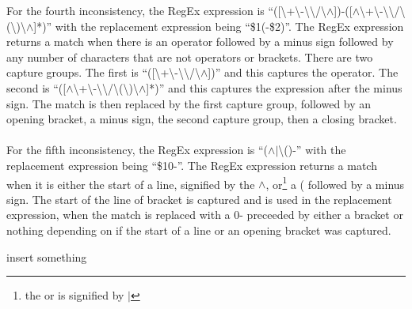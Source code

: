 \documentclass{article}
\begin{document}
For the fourth inconsistency, the RegEx expression is
``([\textbackslash+\textbackslash-\textbackslash*\textbackslash/\textbackslash$\wedge$])-([$\wedge$\textbackslash+\textbackslash-\textbackslash*\textbackslash/\textbackslash(\textbackslash)\textbackslash$\wedge$]*)''
with the replacement expression being ``\$1(-\$2)''. The RegEx expression returns a match when there is an operator followed by a minus sign followed by any number of characters that are not operators or brackets. There are two capture groups. The first is ``([\textbackslash+\textbackslash-\textbackslash*\textbackslash/\textbackslash$\wedge$])'' and this captures the operator. The second is ``([$\wedge$\textbackslash+\textbackslash-\textbackslash*\textbackslash/\textbackslash(\textbackslash)\textbackslash$\wedge$]*)'' and this captures the expression after the minus sign. The match is then replaced by the first capture group, followed by an opening bracket, a minus sign, the second capture group, then a closing bracket.\\ \\
For the fifth inconsistency, the RegEx expression is
``($\wedge$$|$\textbackslash()-'' 
with the replacement expression being ``\$10-''. The RegEx expression returns a match when it is either the start of a line, signified by the $\wedge$, or\footnote{the or is signified by $|$} a ( followed by a minus sign. The start of the line of bracket is captured and is used in the replacement expression, when the match is replaced with a 0- preceeded by either a bracket or nothing depending on if the start of a line or an opening bracket was captured.
\newpage
\begin{thebibliography}{9}

 insert something




\end{thebibliography}
\end{document}
